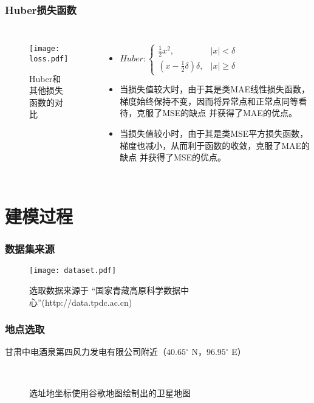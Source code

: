 \documentclass[14pt, AutoFakeBold]{ppt}
\begin{document}
\begin{frame}
  \frametitle{Huber损失函数}
  \begin{columns}
    \begin{figure}[H]
      \centering
      \texttt{[image: loss.pdf]}
      \caption{Huber和其他损失函数的对比}
      \label{fig_loss}
    \end{figure}
      \begin{itemize}
      \item $Huber:
      \left\{\begin{matrix}
          \frac{1}{2}x^{2}, & \left | x  \right | < \delta\\
          (x - \frac1 2 \delta)\delta, & \left | x  \right | \geq \delta
      \end{matrix}\right.$
      \item 当损失值较大时，由于其是类MAE线性损失函数，
      梯度始终保持不变，因而将异常点和正常点同等看待，克服了MSE的缺点
      并获得了MAE的优点。
      \item 当损失值较小时，由于其是类MSE平方损失函数，
      梯度也减小，从而利于函数的收敛，克服了MAE的缺点
      并获得了MSE的优点。
    \end{itemize}
  \end{columns}
\end{frame}

\section{建模过程}

\begin{frame}
  \frametitle{数据集来源}
  \begin{figure}[H]
    \centering
    \texttt{[image: dataset.pdf]}
    \caption{选取数据来源于
    “国家青藏高原科学数据中心”(http://data.tpdc.ac.cn)}
    \label{fig_dataset}
\end{figure}
\end{frame}

\begin{frame}
  \frametitle{地点选取}
  甘肃中电酒泉第四风力发电有限公司附近（$40.65^{\circ}$ N，$96.95^{\circ}$ E）
  \begin{figure}[H]
    \centering
    \\
    \caption{选址地坐标使用谷歌地图绘制出的卫星地图}
    \label{fig_google_maps}
\end{figure}
\end{frame}
\end{document}

